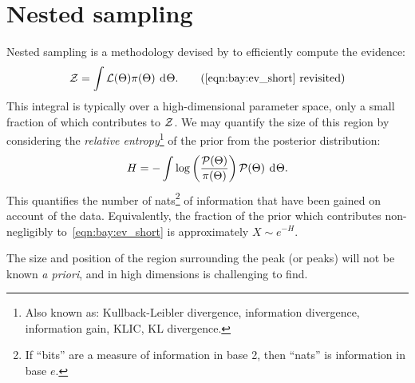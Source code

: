 \section{Nested sampling}
\label{sec:bay:nested_sampling}
%
Nested sampling is a methodology devised by \citet{skilling2006} to efficiently compute the evidence:
\begin{equation}
  \ev = \int \lik(\params) \prior(\params) \: \d{\params}.
  \tag{\ref{eqn:bay:ev_short} revisited}
\end{equation}
This integral is typically over a high-dimensional parameter space, only a small fraction of which contributes to \(\mathcal{Z}\). We may quantify the size of this region by considering the {\em relative entropy\/}\footnote{Also known as: Kullback-Leibler divergence, information divergence, information gain, KLIC, KL divergence.} of the prior from the posterior distribution:
\begin{equation}
  H = -\int \log\left( \frac{\mathcal{P}(\Theta)}{\pi(\Theta)}\right) \mathcal{P}(\Theta)\: \operatorname{d}^{}\!{\Theta}.
  \label{eqn:bay:rel_ent}
\end{equation}  
This quantifies the number of nats\footnote{If ``bits'' are a measure of information in base 2, then ``nats'' is information in base \(e\).} of information that have been gained on account of the data. Equivalently, the fraction of the prior which contributes non-negligibly to~\eqref{eqn:bay:ev_short} is approximately \(X\sim e^{-H}\).

The size and position of the region surrounding the peak (or peaks) will not be known {\em a priori}, and in high dimensions is challenging to find.  


